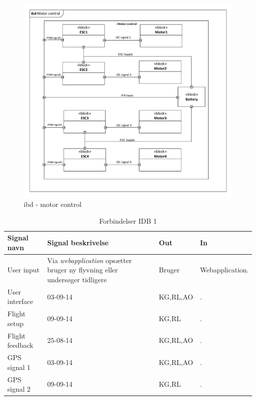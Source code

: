
\begin{figure}[H]
\centering
\includegraphics[width=1\textwidth]{Billeder/IBD/ibd6_motorcontrol.pdf}
\caption{ibd - motor control}
\label{fig:ibd_motorcontrol}
\end{figure}

\begin{table}[H]
	\centering
		\begin{tabular}{|p{2.5 cm}|p{5.5 cm}|p{2.5 cm}|p{2.5 cm}|} 
		\hline
			\textbf{Signal navn} 	& \textbf{Signal beskrivelse}		& \textbf{Out} 				& \textbf{In}     \\ \hline
			User input 			& Via \textit{webapplication} opsætter bruger ny flyvning eller undersøger tidligere & Bruger 		& Webapplication.			    \\ \hline
			User interface 		& 03-09-14	& KG,RL,AO				& .				\\ \hline
			Flight setup		& 09-09-14	& KG,RL					& .	\\ \hline
			Flight feedback		& 25-08-14	& KG,RL,AO				& .			    \\ \hline
			GPS signal 1		& 03-09-14	& KG,RL,AO				& .				\\ \hline
			GPS signal 2		& 09-09-14	& KG,RL					& .	\\ \hline  
		\end{tabular}
	\caption{Forbindelser IDB 1}
	\label{tab:IDB1}
\end{table}

